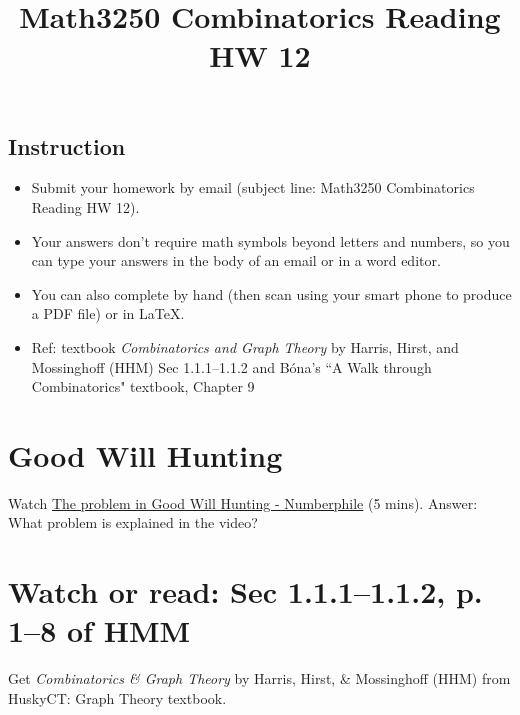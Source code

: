 \documentclass[10pt]{amsart}
\title{Math3250 Combinatorics Reading HW 12}
\begin{document}
\maketitle



\subsection*{Instruction}

\begin{itemize}
\item 
Submit your homework by email (subject line: Math3250 Combinatorics Reading HW 12). 
\item Your answers don't require math symbols beyond letters and numbers, so you can type your answers in the body of an email or in a word editor.
\item 
You can also complete by hand (then scan using your smart phone to produce a PDF file) or in \LaTeX. %
\item
Ref: textbook \emph{Combinatorics and Graph Theory} by Harris, Hirst, and Mossinghoff (HHM) Sec 1.1.1--1.1.2 and
 B\'ona's ``A Walk through Combinatorics" textbook, Chapter 9
\end{itemize}





\section{Good Will Hunting}


Watch \href{https://www.youtube.com/watch?v=iW_LkYiuTKE}{The problem in Good Will Hunting - Numberphile} (5 mins). Answer:
What problem is explained in the video?





\section{Watch or read: Sec 1.1.1--1.1.2, p. 1--8 of HMM}
Get \emph{Combinatorics \& Graph Theory} by Harris, Hirst, \& Mossinghoff (HHM) from HuskyCT: Graph Theory textbook.
\end{document}
